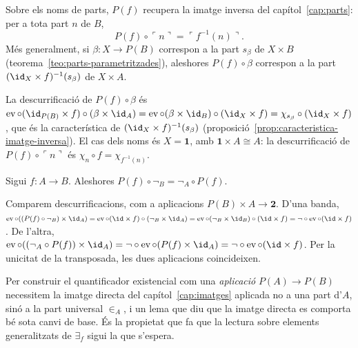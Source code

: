 \begin{proposicio}\label{prop:imatge-inversa-interna}
Sobre els noms de parts, \(P(f)\) recupera la imatge inversa del
capítol~\ref{cap:parts}: per a tota part \(n\) de \(B\),
\[
P(f)\circ\ulcorner n\urcorner=\ulcorner f^{-1}(n)\urcorner .
\]
Més generalment, si \(\beta\colon X\to P(B)\) correspon a la part
\(s_\beta\) de \(X\times B\) (teorema~\ref{teo:parts-parametritzades}),
aleshores \(P(f)\circ\beta\) correspon a la part
\((\id_X\times f)^{-1}(s_\beta)\) de \(X\times A\).
\end{proposicio}

\begin{prova}
La descurrificació de \(P(f)\circ\beta\) és
\(\operatorname{ev}\circ(\id_{P(B)}\times f)\circ(\beta\times\id_A)
=\operatorname{ev}\circ(\beta\times\id_B)\circ(\id_X\times f)
=\chi_{s_\beta}\circ(\id_X\times f)\),
que és la característica de \((\id_X\times f)^{-1}(s_\beta)\)
(proposició~\ref{prop:caracteristica-imatge-inversa}). El cas dels noms és
\(X=\mathbf1\), amb \(\mathbf1\times A\cong A\): la descurrificació de
\(P(f)\circ\ulcorner n\urcorner\) és \(\chi_n\circ f=\chi_{f^{-1}(n)}\).
\end{prova}

\begin{proposicio}\label{prop:imatge-inversa-complement}
Sigui \(f\colon A\to B\). Aleshores \(P(f)\circ\neg_B=\neg_A\circ P(f)\).
\end{proposicio}

\begin{prova}
Comparem descurrificacions, com a aplicacions \(P(B)\times A\to\mathbf2\).
D'una banda,
\(\operatorname{ev}\circ((P(f)\circ\neg_B)\times\id_A)
=\operatorname{ev}\circ(\id\times f)\circ(\neg_B\times\id_A)
=\operatorname{ev}\circ(\neg_B\times\id_B)\circ(\id\times f)
=\neg\circ\operatorname{ev}\circ(\id\times f)\).
De l'altra,
\(\operatorname{ev}\circ((\neg_A\circ P(f))\times\id_A)
=\neg\circ\operatorname{ev}\circ(P(f)\times\id_A)
=\neg\circ\operatorname{ev}\circ(\id\times f)\).
Per la unicitat de la transposada, les dues aplicacions coincideixen.
\end{prova}

Per construir el quantificador existencial com una \emph{aplicació}
\(P(A)\to P(B)\) necessitem la imatge directa del capítol~\ref{cap:imatges}
aplicada no a una part d'\(A\), sinó a la part universal \(\in_A\), i un
lema que diu que la imatge directa es comporta bé sota canvi de base. És
la propietat que fa que la lectura sobre elements generalitzats de
\(\exists_f\) sigui la que s'espera.

